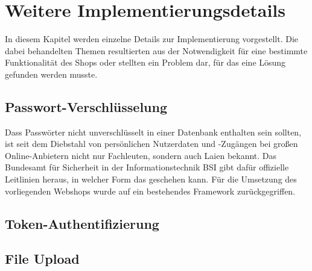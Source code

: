 \section{Weitere Implementierungsdetails} \thispagestyle{nomarkstyle}
In diesem Kapitel werden einzelne Details zur Implementierung vorgestellt.
Die dabei behandelten Themen resultierten aus der Notwendigkeit für eine bestimmte Funktionalität des Shops oder stellten ein Problem dar, für das eine Lösung gefunden werden musste.
\subsection{Passwort-Verschlüsselung}
Dass Passwörter nicht unverschlüsselt in einer Datenbank enthalten sein sollten, ist seit dem Diebstahl von persönlichen Nutzerdaten und -Zugängen bei großen Online-Anbietern nicht nur Fachleuten, sondern auch Laien bekannt.
Das Bundesamt für Sicherheit in der Informationstechnik \acs{BSI} gibt dafür offizielle Leitlinien heraus, in welcher Form das geschehen kann.\cite{BSI2016}
Für die Umsetzung des vorliegenden Webshops wurde auf ein bestehendes Framework zurückgegriffen.
\subsection{Token-Authentifizierung}
\subsection{File Upload}
